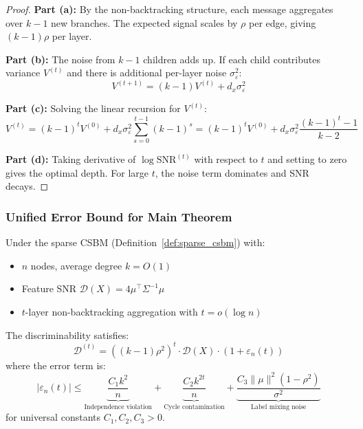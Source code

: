 \begin{proof}
\textbf{Part (a):} By the non-backtracking structure, each message aggregates over $k-1$ new branches. The expected signal scales by $\rho$ per edge, giving $(k-1)\rho$ per layer.

\textbf{Part (b):} The noise from $k-1$ children adds up. If each child contributes variance $V^{(t)}$ and there is additional per-layer noise $\sigma_{\varepsilon}^2$:
\begin{equation}
    V^{(t+1)} = (k-1) V^{(t)} + d_x \sigma_{\varepsilon}^2
\end{equation}

\textbf{Part (c):} Solving the linear recursion for $V^{(t)}$:
\begin{equation}
    V^{(t)} = (k-1)^t V^{(0)} + d_x \sigma_{\varepsilon}^2 \sum_{s=0}^{t-1} (k-1)^s = (k-1)^t V^{(0)} + d_x \sigma_{\varepsilon}^2 \frac{(k-1)^t - 1}{k-2}
\end{equation}

\textbf{Part (d):} Taking derivative of $\log \mathrm{SNR}^{(t)}$ with respect to $t$ and setting to zero gives the optimal depth. For large $t$, the noise term dominates and SNR decays.
\end{proof}

\subsubsection{Unified Error Bound for Main Theorem}

\begin{theorem}
\label{thm:complete_with_error}
Under the sparse CSBM (Definition~\ref{def:sparse_csbm}) with:
\begin{itemize}
    \item $n$ nodes, average degree $k = O(1)$
    \item Feature SNR $\mathcal{D}(X) = 4\mu^\top \Sigma^{-1} \mu$
    \item $t$-layer non-backtracking aggregation with $t = o(\log n)$
\end{itemize}

The discriminability satisfies:
\begin{equation}
    \mathcal{D}^{(t)} = ((k-1)\rho^2)^t \cdot \mathcal{D}(X) \cdot (1 + \varepsilon_n(t))
\end{equation}
where the error term is:
\begin{equation}
    |\varepsilon_n(t)| \leq \underbrace{\frac{C_1 k^2}{n}}_{\text{Independence violation}} + \underbrace{\frac{C_2 k^{2t}}{n}}_{\text{Cycle contamination}} + \underbrace{\frac{C_3 \|\mu\|^2 (1-\rho^2)}{\sigma^2}}_{\text{Label mixing noise}}
\end{equation}
for universal constants $C_1, C_2, C_3 > 0$.
\end{theorem}

